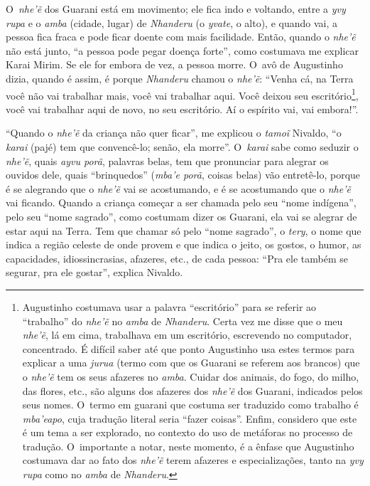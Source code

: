 O~\emph{nhe’ẽ} dos Guarani está em movimento; ele fica indo e
voltando, entre a \emph{yvy rupa} e o \emph{amba} (cidade, lugar) de \emph{Nhanderu} (o
\emph{yvate}, o alto), e quando vai, a pessoa fica fraca e pode ficar doente
com mais facilidade. Então, quando o \emph{nhe’ẽ} não está junto, ``a
pessoa pode pegar doença forte'', como costumava me explicar Karai
Mirim. Se ele for embora de vez, a pessoa morre. O~avô de Augustinho
dizia, quando é assim, é porque \emph{Nhanderu} chamou o \emph{nhe’ẽ}: ``Venha
cá, na Terra você não vai trabalhar mais, você vai trabalhar aqui. Você
deixou seu escritório\footnote{Augustinho costumava usar a palavra
``escritório'' para se referir ao ``trabalho'' do \emph{nhe’ẽ} no \emph{amba} de
\emph{Nhanderu}. Certa vez me disse que o meu \emph{nhe’ẽ}, lá em cima,
trabalhava em um escritório, escrevendo no computador, concentrado. É
difícil saber até que ponto Augustinho usa estes termos para explicar a
uma \emph{jurua} (termo com que os Guarani se referem aos brancos) que o
\emph{nhe’ẽ} tem os seus afazeres no \emph{amba}. Cuidar dos animais, do fogo,
do milho, das flores, etc., são alguns dos afazeres dos \emph{nhe’ẽ} dos
Guarani, indicados pelos seus nomes. O~termo em guarani que costuma ser
traduzido como trabalho é \emph{mba’eapo}, cuja tradução literal seria
``fazer coisas''. Enfim, considero que este é um tema a ser explorado, no
contexto do uso de metáforas no processo de tradução. O~importante a
notar, neste momento, é a ênfase que Augustinho costumava dar ao fato
dos \emph{nhe’ẽ} terem afazeres e especializações, tanto na \emph{yvy rupa} como
no \emph{amba} de \emph{Nhanderu}.}, você vai trabalhar aqui de novo, no seu
escritório. Aí o espírito vai, vai embora!''.

``Quando o \emph{nhe’ẽ} da criança não quer ficar'', me explicou o
\emph{tamoĩ} Nivaldo, ``o \emph{karai} (pajé) tem que convencê-lo; senão, ela
morre''. O~\emph{karai} sabe como seduzir o \emph{nhe’ẽ}, quais \emph{ayvu porã},
palavras belas, tem que pronunciar para alegrar os ouvidos dele, quais
``brinquedos'' (\emph{mba’e porã}, coisas belas) vão entretê-lo, porque é se
alegrando que o \emph{nhe’ẽ} vai se acostumando, e é se acostumando que
o \emph{nhe’ẽ} vai ficando. Quando a criança começar a ser chamada pelo
seu ``nome indígena'', pelo seu ``nome sagrado'', como costumam dizer os
Guarani, ela vai se alegrar de estar aqui na Terra. Tem que chamar só
pelo ``nome sagrado'', o \emph{tery}, o nome que indica a região celeste de onde
provem e que indica o jeito, os gostos, o humor, as capacidades,
idiossincrasias, afazeres, etc., de cada pessoa: ``Pra ele também se
segurar, pra ele gostar'', explica Nivaldo.

